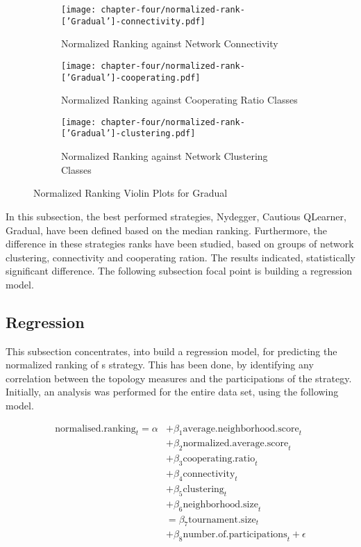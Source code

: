 \begin{figure}[!hbtp]
	\centering
	\begin{subfigure}[t]{0.70\textwidth}
		\centering
		\texttt{[image: chapter-four/normalized-rank-['Gradual']-connectivity.pdf]}
		\caption{Normalized Ranking against Network Connectivity}
	\end{subfigure}
	\hfill
	\begin{subfigure}[t]{0.70\textwidth}\centering
		\centering
		\texttt{[image: chapter-four/normalized-rank-['Gradual']-cooperating.pdf]}
		\caption{Normalized Ranking against Cooperating Ratio Classes}
	\end{subfigure}
	\hfill
	\begin{subfigure}[t]{0.70\textwidth}\centering
		\centering
		\texttt{[image: chapter-four/normalized-rank-['Gradual']-clustering.pdf]}
		\caption{Normalized Ranking against Network Clustering Classes}
	\end{subfigure}
	\caption{Normalized Ranking Violin Plots for Gradual}
	\label{gradual}
\end{figure}

In this subsection, the best performed strategies, Nydegger, Cautious QLearner, Gradual,
have been defined based on the median ranking. Furthermore, the difference in
these strategies ranks have been studied, based on groups of network clustering,
connectivity and cooperating ration. The results indicated, statistically significant
difference. The following subsection focal point is building a regression model.

\subsection{Regression}

This subsection concentrates, into build a regression model, for predicting
the normalized ranking of s strategy. This has been done, by identifying any
correlation between the topology measures and the participations of the strategy.
Initially, an analysis was performed for the entire data set, using the following
model.

\begin{align}
	\mathrm{normalised.ranking}_{t} = \alpha
	  & + \beta_{1}  \mathrm{average.neighborhood.score}_{t}          \\
	  & + \beta_{2}  \mathrm{normalized.average.score}_{t}            \\
	  & + \beta_{3}  \mathrm{cooperating.ratio}_{t}                   \\
	  & + \beta_{4}  \mathrm{connectivity}_{t}                        \\
	  & + \beta_{5}  \mathrm{clustering}_{t}                          \\
	  & + \beta_{6}  \mathrm{neighborhood.size}_{t}                   \\
	  & = \beta_{7}  \mathrm{tournament.size}_{t}                     \\
	  & + \beta_{8}  \mathrm{number.of.participations}_{t} + \epsilon
\end{align}

